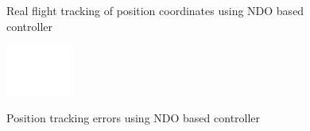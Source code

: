\documentclass[letterpaper%
, twoside%
, 12pt%
,memoire%
, english%
,creativecommons,hyperref%
]{thETS}
\theoremstyle{newThmStyle}
\begin{document}
\begin{figure}[H]
	\centering
	\parbox{0.75\textwidth}{\caption{Real flight tracking of position coordinates using NDO based controller\label{Fig:xyztracNDO}}}
\end{figure}
\begin{figure}[H]
	\includegraphics[width=0.2\textwidth]{Figures/blank.png}
\end{figure}
\begin{figure}[H]
	\centering
	\parbox{0.75\textwidth}{\caption{Position tracking errors using NDO based controller\label{Fig:xyzerrNDO}}}
\end{figure}
\end{document}
